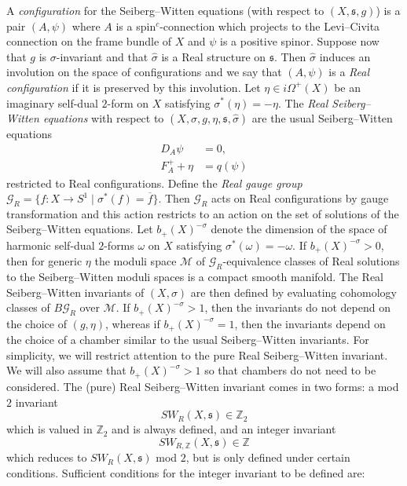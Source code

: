 \documentclass{amsart}
\theoremstyle{definition}
\theoremstyle{remark}
\numberwithin{equation}{section}
\begin{document}
A {\em configuration} for the Seiberg--Witten equations (with respect to $(X,\mathfrak{s},g)$) is a pair $(A , \psi)$ where $A$ is a spin$^c$-connection which projects to the Levi--Civita connection on the frame bundle of $X$ and $\psi$ is a positive spinor. Suppose now that $g$ is $\sigma$-invariant and that $\widehat{\sigma}$ is a Real structure on $\mathfrak{s}$. Then $\widehat{\sigma}$ induces an involution on the space of configurations and we say that $(A , \psi)$ is a {\em Real configuration} if it is preserved by this involution. Let $\eta \in i \Omega^+(X)$ be an imaginary self-dual $2$-form on $X$ satisfying $\sigma^*(\eta) = -\eta$. The {\em Real Seiberg--Witten equations} with respect to $(X , \sigma , g , \eta , \mathfrak{s} , \widehat{\sigma})$ are the usual Seiberg--Witten equations
\begin{align*}
D_A \psi &= 0, \\
F^+_A + \eta &= q(\psi)
\end{align*}
restricted to Real configurations. Define the {\em Real gauge group} $\mathcal{G}_R = \{ f : X \to S^1 \; | \; \sigma^*(f) = \overline{f} \}$. Then $\mathcal{G}_R$ acts on Real configurations by gauge transformation and this action restricts to an action on the set of solutions of the Seiberg--Witten equations. Let $b_+(X)^{-\sigma}$ denote the dimension of the space of harmonic self-dual $2$-forms $\omega$ on $X$ satisfying $\sigma^*(\omega) = -\omega$. If $b_+(X)^{-\sigma} > 0$, then for generic $\eta$ the moduli space $\mathcal{M}$ of $\mathcal{G}_R$-equivalence classes of Real solutions to the Seiberg--Witten moduli spaces is a compact smooth manifold. The Real Seiberg--Witten invariants of $(X,\sigma)$ are then defined by evaluating cohomology classes of $B\mathcal{G}_R$ over $\mathcal{M}$. If $b_+(X)^{-\sigma} > 1$, then the invariants do not depend on the choice of $(g,\eta)$, whereas if $b_+(X)^{-\sigma} = 1$, then the invariants depend on the choice of a chamber similar to the usual Seiberg--Witten invariants. For simplicity, we will restrict attention to the pure Real Seiberg--Witten invariant. We will also assume that $b_+(X)^{-\sigma} > 1$ so that chambers do not need to be considered. The (pure) Real Seiberg--Witten invariant comes in two forms: a mod $2$ invariant
\[
SW_R(X , \mathfrak{s}) \in \mathbb{Z}_2
\]
which is valued in $\mathbb{Z}_2$ and is always defined, and an integer invariant
\[
SW_{R,\mathbb{Z}}(X , \mathfrak{s}) \in \mathbb{Z}
\]
which reduces to $SW_R(X,\mathfrak{s})$ mod $2$, but is only defined under certain conditions. Sufficient conditions for the integer invariant to be defined are: 
\end{document}

